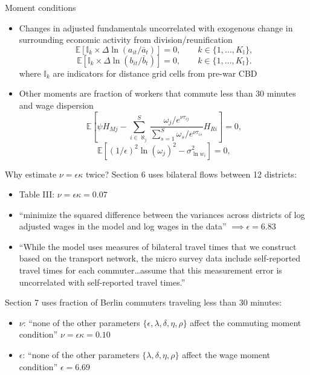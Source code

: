 \documentclass[11pt,notes=hide,aspectratio=169]{beamer}
\begin{document}
\begin{frame}{Moment conditions}
\begin{itemize}
\item Changes in adjusted fundamentals uncorrelated with exogenous change in surrounding economic activity from division/reunification
\begin{equation*}
\mathbb{E} \left[ \mathbb{I}_{k} \times \Delta \ln \left( a_{it} / \bar{a}_{t} \right) \right] = 0, \qquad k \in \{1, \dots, K_{\mathbb{I}}\},
\end{equation*}
\begin{equation*}
\mathbb{E} \left[ \mathbb{I}_{k} \times \Delta \ln \left( b_{it} / \bar{b}_{t} \right) \right] = 0, \qquad k \in \{1, \dots, K_{\mathbb{I}}\}.
\end{equation*}
where $ \mathbb{I}_{k}$ are indicators for distance grid cells from pre-war CBD
\item Other moments are fraction of workers that commute less than 30 minutes and wage dispersion
\begin{equation*}
\mathbb{E} \left[ \psi H_{Mj} - \sum_{i \in \aleph_{j}}^{S} \frac{ \omega_{j} / e^{\nu \tau_{ij}} }
{\sum_{s=1}^{S} \omega_{s} / e^{\nu \tau_{is}} } H_{Ri} \right] = 0,
\end{equation*}
\begin{equation*}
\mathbb{E} \left[ \left( 1/\epsilon \right)^{2} \ln \left( \omega_{j} \right)^{2} - \sigma_{\ln w_{i}}^{2} \right] = 0,
\end{equation*}
\end{itemize}
\end{frame}
\begin{frame}{Why estimate $\nu = \epsilon \kappa$ twice?}
Section 6 uses bilateral flows between 12 districts:
\begin{itemize}
\item Table III: $\nu = \epsilon \kappa = 0.07$
\item ``minimize the squared difference between the variances across districts of log adjusted wages in the model and log wages in the data'' $\implies \epsilon = 6.83$
\item ``While the model uses measures of bilateral travel times that we construct based on the transport network, the micro survey data include self-reported travel times for each commuter\dots assume that this measurement error is uncorrelated with self-reported travel times.''
\end{itemize}
Section 7 uses fraction of Berlin commuters traveling less than 30 minutes:
\begin{itemize}
\item $\nu$: ``none of the other parameters $\{\epsilon,\lambda,\delta,\eta,\rho\}$ affect the commuting moment condition'' $\nu = \epsilon \kappa = 0.10$ 
\item $\epsilon$: ``none of the other parameters $\{\lambda,\delta,\eta,\rho\}$ affect the wage moment condition'' $\epsilon = 6.69$
\end{itemize}
\end{frame}
\end{document}
